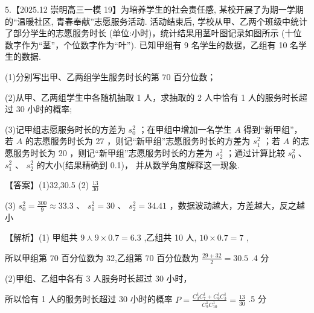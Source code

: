 \documentclass[10pt]{article}
\begin{document}
5.【2025.12 崇明高三一模 19】为培养学生的社会责任感, 某校开展了为期一学期的“温暖社区, 青春奉献”志愿服务活动. 活动结束后, 学校从甲、乙两个班级中统计了部分学生的志愿服务时长 (单位:小时)，统计结果用茎叶图记录如图所示 (十位数字作为“茎”，个位数字作为“叶”). 已知甲组有 9 名学生的数据，乙组有 10 名学生的数据.

(1)分别写出甲、乙两组学生服务时长的第 70 百分位数；

(2)从甲、乙两组学生中各随机抽取 1 人，求抽取的 2 人中恰有 1 人的服务时长超过 30 小时的概率;

(3)记甲组志愿服务时长的方差为 \({s}_{0}^{2}\) ；在甲组中增加一名学生 \(A\) 得到“新甲组”，若 \(A\) 的志愿服务时长为 27 ，则记“新甲组”志愿服务时长的方差为 \({s}_{1}^{2}\) ；若 \(A\) 的志愿服务时长为 20 ，则记“新甲组”志愿服务时长的方差为 \({s}_{2}^{2}\) ；通过计算比较 \({s}_{0}^{2}\) 、 \({s}_{1}^{2}\) 、 \({s}_{2}^{2}\) 的大小(结果精确到 0.1)， 并从数学角度解释这一现象.

\begin{center}
\end{center}

【答案】(1)32,30.5 (2) \(\frac{13}{30}\)

(3) \({s}_{0}^{2} = \frac{300}{9} \approx  {33.3}\text{ 、 }{s}_{1}^{2} = {30}\text{ 、 }{s}_{2}^{2} = {34.41}\) ，数据波动越大，方差越大，反之越小

【解析】(1) 甲组共 \(9 \curlywedge  9 \times  {0.7} = {6.3}\) ,乙组共 10 人, \({10} \times  {0.7} = 7\) ,

所以甲组第 70 百分位数为 32,乙组第 70 百分位数为 \(\frac{{29} + {32}}{2} = {30.5}\) .4 分

(2)甲组、乙组中各有 3 人服务时长超过 30 小时，

所以恰有 1 人的服务时长超过 30 小时的概率 \(P = \frac{{C}_{3}^{1}{C}_{7}^{1} + {C}_{6}^{1}{C}_{3}^{1}}{{C}_{9}^{1}{C}_{10}^{1}} = \frac{13}{30}\) .5 分
\end{document}
